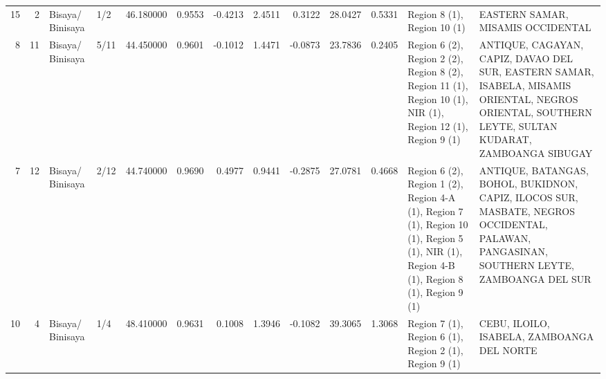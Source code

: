 \begin{tabular}{rrllrrrrrrrll}
15 & 2 & Bisaya/ Binisaya & 1/2 & {\cellcolor[HTML]{F18F71}} \color[HTML]{F1F1F1} 46.180000 & 0.9553 & -0.4213 & 2.4511 & 0.3122 & 28.0427 & 0.5331 & Region 8 (1), Region 10 (1) & EASTERN SAMAR, MISAMIS OCCIDENTAL \\
8 & 11 & Bisaya/ Binisaya & 5/11 & {\cellcolor[HTML]{F7AF91}} \color[HTML]{000000} 44.450000 & 0.9601 & -0.1012 & 1.4471 & -0.0873 & 23.7836 & 0.2405 & Region 6 (2), Region 2 (2), Region 8 (2), Region 11 (1), Region 10 (1), NIR (1), Region 12 (1), Region 9 (1) & ANTIQUE, CAGAYAN, CAPIZ, DAVAO DEL SUR, EASTERN SAMAR, ISABELA, MISAMIS ORIENTAL, NEGROS ORIENTAL, SOUTHERN LEYTE, SULTAN KUDARAT, ZAMBOANGA SIBUGAY \\
7 & 12 & Bisaya/ Binisaya & 2/12 & {\cellcolor[HTML]{F7A98B}} \color[HTML]{000000} 44.740000 & 0.9690 & 0.4977 & 0.9441 & -0.2875 & 27.0781 & 0.4668 & Region 6 (2), Region 1 (2), Region 4-A (1), Region 7 (1), Region 10 (1), Region 5 (1), NIR (1), Region 4-B (1), Region 8 (1), Region 9 (1) & ANTIQUE, BATANGAS, BOHOL, BUKIDNON, CAPIZ, ILOCOS SUR, MASBATE, NEGROS OCCIDENTAL, PALAWAN, PANGASINAN, SOUTHERN LEYTE, ZAMBOANGA DEL SUR \\
10 & 4 & Bisaya/ Binisaya & 1/4 & {\cellcolor[HTML]{DA5A49}} \color[HTML]{F1F1F1} 48.410000 & 0.9631 & 0.1008 & 1.3946 & -0.1082 & 39.3065 & 1.3068 & Region 7 (1), Region 6 (1), Region 2 (1), Region 9 (1) & CEBU, ILOILO, ISABELA, ZAMBOANGA DEL NORTE \\
\bottomrule
\end{tabular}
